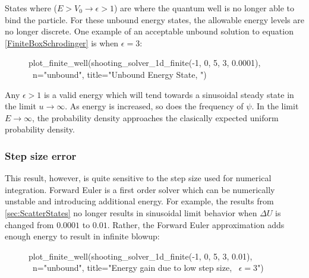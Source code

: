 \documentclass{article}
\begin{document}
States where ($E > V_0 \rightarrow \epsilon > 1$) are where the quantum well is
no longer able to bind the particle. For these unbound energy states, the
allowable energy levels are no longer discrete. One example of an acceptable
unbound solution to equation \eqref{FiniteBoxSchrodinger} is when $\epsilon = 3$:

\begin{figure}[H]
\begin{sageblock}
plot_finite_well(shooting_solver_1d_finite(-1, 0, 5, 3, 0.0001), \
                 n="unbound", title="Unbound Energy State, ")
\end{sageblock}
\vspace{-.1in}
\centering
{}
\end{figure}

Any $\epsilon > 1$ is a valid energy which will tend towards a sinusoidal steady
state in the limit $u \rightarrow \infty$. As energy is increased, so does the
frequency of $\psi$. In the limit $E \rightarrow \infty$, the probability
density approaches the clasically expected uniform probability density. 

\subsubsection{Step size error}\label{StepSizeError}
This result, however, is quite sensitive to the step size used for numerical
integration. Forward Euler is a first order solver which can be numerically
unstable and introducing additional energy. For example, the results from
\ref{sec:ScatterStates} no longer results in sinusoidal limit behavior when $\Delta
U$ is changed from $0.0001$ to $0.01$.  Rather, the Forward Euler approximation
adds enough energy to result in infinite blowup:

\begin{figure}[H]
\begin{sageblock}
plot_finite_well(shooting_solver_1d_finite(-1, 0, 5, 3, 0.01), \
                      n="unbound", title="Energy gain due to low step size, \
                                          $\epsilon=3$")
\end{sageblock}
\vspace{-.1in}
\centering
{}
\end{figure}
\end{document}
